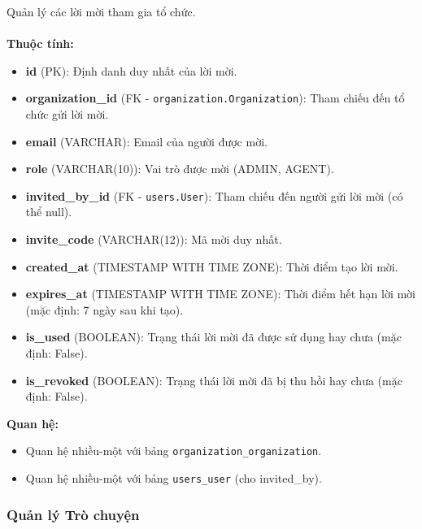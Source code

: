  Quản lý các lời mời tham gia tổ chức. \\\\
\indent\textbf{Thuộc tính:}
\begin{itemize}
    \item \textbf{id} (PK): Định danh duy nhất của lời mời.
    \item \textbf{organization\_id} (FK - \texttt{organization.Organization}): Tham chiếu đến tổ chức gửi lời mời.
    \item \textbf{email} (VARCHAR): Email của người được mời.
    \item \textbf{role} (VARCHAR(10)): Vai trò được mời (ADMIN, AGENT).
    \item \textbf{invited\_by\_id} (FK - \texttt{users.User}): Tham chiếu đến người gửi lời mời (có thể null).
    \item \textbf{invite\_code} (VARCHAR(12)): Mã mời duy nhất.
    \item \textbf{created\_at} (TIMESTAMP WITH TIME ZONE): Thời điểm tạo lời mời.
    \item \textbf{expires\_at} (TIMESTAMP WITH TIME ZONE): Thời điểm hết hạn lời mời (mặc định: 7 ngày sau khi tạo).
    \item \textbf{is\_used} (BOOLEAN): Trạng thái lời mời đã được sử dụng hay chưa (mặc định: False).
    \item \textbf{is\_revoked} (BOOLEAN): Trạng thái lời mời đã bị thu hồi hay chưa (mặc định: False).
\end{itemize}
\textbf{Quan hệ:}
\begin{itemize}
    \item Quan hệ nhiều-một với bảng \texttt{organization\_organization}.
    \item Quan hệ nhiều-một với bảng \texttt{users\_user} (cho invited\_by).
\end{itemize}

\subsubsection{Quản lý Trò chuyện}

